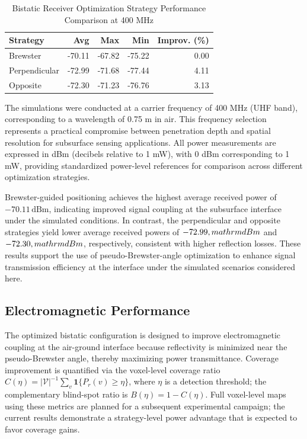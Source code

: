 \documentclass[conference]{IEEEtran}
\begin{document}
\begin{table}[hbt]
\centering
\caption{Bistatic Receiver Optimization Strategy Performance Comparison at 400 MHz}
\label{tab:optimization_results}
\setlength{\tabcolsep}{4pt} %
\small
\begin{tabular}{lrrrr}
\toprule
\textbf{Strategy} & \textbf{Avg} & \textbf{Max} & \textbf{Min} & \textbf{Improv. (\%)} \\
\midrule
Brewster & -70.11 & -67.82 & -75.22 & 0.00 \\
Perpendicular & -72.99 & -71.68 & -77.44 & 4.11 \\
Opposite & -72.30 & -71.23 & -76.76 & 3.13 \\
\bottomrule
\end{tabular}
\end{table}


The simulations were conducted at a carrier frequency of 400 MHz (UHF band), corresponding to a wavelength of 0.75 m in air. This frequency selection represents a practical compromise between penetration depth and spatial resolution for subsurface sensing applications. All power measurements are expressed in dBm (decibels relative to 1 mW), with 0 dBm corresponding to 1 mW, providing standardized power-level references for comparison across different optimization strategies.

Brewster-guided positioning achieves the highest average received power of $-70.11 \,\mathrm{dBm}$, indicating improved signal coupling at the subsurface interface under the simulated conditions. In contrast, the perpendicular and opposite strategies yield lower average received powers of $-72.99, \\mathrm{dBm}$ and $-72.30, \\mathrm{dBm}$, respectively, consistent with higher reflection losses. These results support the use of pseudo-Brewster-angle optimization to enhance signal transmission efficiency at the interface under the simulated scenarios considered here.

\subsection{Electromagnetic Performance}

The optimized bistatic configuration is designed to improve electromagnetic coupling at the air-ground interface because reflectivity is minimized near the pseudo-Brewster angle, thereby maximizing power transmittance. Coverage improvement is quantified via the voxel-level coverage ratio $C(\eta) = |\mathcal{V}|^{-1}\sum_{v}\mathbf{1}\{P_r(v)\ge\eta\}$, where $\eta$ is a detection threshold; the complementary blind-spot ratio is $B(\eta)=1-C(\eta)$. Full voxel-level maps using these metrics are planned for a subsequent experimental campaign; the current results demonstrate a strategy-level power advantage that is expected to favor coverage gains.
\end{document}
